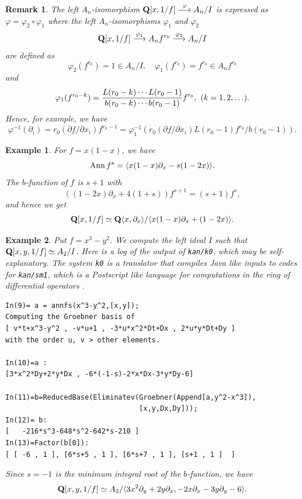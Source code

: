 \documentclass[12pt]{article}
\def\Ann{ {\rm Ann}\, }
\def\pd#1{ \partial_{#1} }
\def\Q{{\bf Q}}
\newtheorem{example}{Example}[section]
\newtheorem{remark}{Remark}[section]
\begin{document}
\begin{remark} \rm
The left $A_n$-isomorphism
$  \Q [x,1/f] \stackrel{\varphi}{\longrightarrow} A_n/I $
is expressed as $\varphi = \varphi_2 \circ \varphi_1$ where
the left $A_n$-isomorphisms $\varphi_1$ and $\varphi_2$
$$ \Q [x,1/f] \stackrel{\varphi_1}{\longrightarrow} A_n f^{r_0}
              \stackrel{\varphi_2}{\longrightarrow} A_n/I
$$
are defined as
$$ \varphi_2(f^{r_0}) = 1 \in A_n/I, \quad
   \varphi_1(f^{r_0}) = f^{r_0} \in A_n f^{r_0}
$$
and
$$  \varphi_1(f^{r_0-k}) =
 { {L(r_0-k) \cdots L(r_0-1)} \over {b(r_0-k) \cdots b(r_0-1)}} f^{r_0},
\  (k=1, 2, \ldots ).
$$
Hence, for example, we have
$$\varphi^{-1}(\pd{i}) = r_0 (\partial f/\partial x_i) f^{r_0-1}
= \varphi_1^{-1}(r_0 (\partial f/\partial x_i) L(r_0-1) f^{r_0}/b(r_0-1)).
$$
\end{remark}

\begin{example}  \rm
For $f = x (1-x)$, we have
$$ \Ann f^s = \langle x (1-x) \pd{x} - s (1-2x) \rangle. $$
The $b$-function of $f$ is $s+1$ with
$$ ((1-2x) \pd{x} + 4 (1+s)) f^{s+1} = (s+1) f^s, $$
and hence we get 
$$ \Q[x,1/f] \simeq \Q\langle x, \pd{x} \rangle 
            / \langle x(1-x) \pd{x} + (1-2x) \rangle.
$$
\end{example}

\begin{example} \rm
Put $f = x^3-y^2$.  We compute the left ideal $I$ such that
$\Q[x,y,1/f] \simeq A_2/I$.
Here is a log of the output of {\tt kan/k0}, which may be self-explanatory.
The system {\tt k0} is a translator 
that compiles Java like inputs to codes for 
{\tt kan/sm1}, which is a Postscript like language for computations in
the ring of differential operators \cite{Kan-sm1}.
\begin{verbatim}
In(9)= a = annfs(x^3-y^2,[x,y]);
Computing the Groebner basis of 
[ v*t+x^3-y^2 , -v*u+1 , -3*u*x^2*Dt+Dx , 2*u*y*Dt+Dy ] 
with the order u, v > other elements.

In(10)=a :
[3*x^2*Dy+2*y*Dx , -6*(-1-s)-2*x*Dx-3*y*Dy-6] 

In(11)=b=ReducedBase(Eliminatev(Groebner(Append[a,y^2-x^3]),
                                [x,y,Dx,Dy]));
In(12)= b:
[   -216*s^3-648*s^2-642*s-210 ]
In(13)=Factor(b[0]):
[ [ -6 , 1 ], [6*s+5 , 1 ], [6*s+7 , 1 ], [s+1 , 1 ]  ] 
\end{verbatim}
Since $s = -1$ is the minimum integral root of the $b$-function, we have
$$ \Q[x,y,1/f] \simeq A_2/\langle 3x^2\pd{y}+2y\pd{x}, 
                            -2x\pd{x}-3y\pd{y}-6 \rangle.
$$
\end{example}
\end{document}
